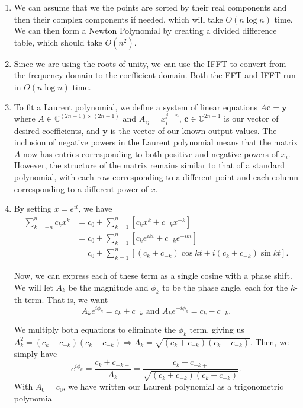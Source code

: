 \documentclass{article}
\begin{document}
\begin{solution}
\begin{enumerate}[label = (\alph*)]
    \item We can assume that we the points are sorted by their real components and then their complex components if needed, which will take $O(n \log n)$ time. We can then form a Newton Polynomial by creating a divided difference table, which should take $O(n^2)$.

    \item Since we are using the roots of unity, we can use the IFFT to convert from the frequency domain to the coefficient domain. Both the FFT and IFFT run in $O(n \log n)$ time.

    \item To fit a Laurent polynomial, we define a system of linear equations $A \boldsymbol{c} = \boldsymbol{y}$ where $A \in \mathbb{C}^{(2n + 1) \times (2n+ 1)}$ and $A_{ij} = x_i^{j-n}$, $\boldsymbol{c} \in \mathbb{C}^{2n + 1}$ is our vector of desired coefficients, and $\boldsymbol{y}$ is the vector of our known output values. The inclusion of negative powers in the Laurent polynomial means that the matrix $A$ now has entries corresponding to both positive and negative powers of $x_i$. However, the structure of the matrix remains similar to that of a standard polynomial, with each row corresponding to a different point and each column corresponding to a different power of $x$.

    \item By setting $x = e^{it}$, we have
	\begin{align*}
		\sum_{k = -n}^n c_kx^k &= c_0 + \sum_{k = 1}^n \left[ c_kx^k + c_{-k}x^{-k}\right]\\
		&= c_0 + \sum_{k = 1}^n \left[ c_ke^{ikt} + c_{-k}e^{-ikt}\right]\\
		&=  c_0 + \sum_{k = 1}^n \left[ (c_k + c_{-k})\cos kt + i (c_k + c_{-k})\sin kt\right].
	\end{align*}

	Now, we can express each of these term as a single cosine with a phase shift. We will let $A_k$ be the magnitude and $\phi_k$ to be the phase angle, each for the $k$-th term. That is, we want $$A_k e^{i \phi_k} = c_k + c_{-k} \text{ and } A_k e^{-i \phi_k} = c_k - c_{-k}.$$

We multiply both equations to eliminate the $\phi_k$ term, giving us $A^2_k = (c_k + c_{-k})(c_k - c_{-k}) \Rightarrow A_k = \sqrt{ (c_k + c_{-k})(c_k - c_{-k})}$. Then, we simply have $$e^{i\phi_k} = \dfrac{c_k + c_{-k+}}{A_k} = \dfrac{c_k + c_{-k+}}{\sqrt{ (c_k + c_{-k})(c_k - c_{-k})}}.$$ With $A_0 = c_0$, we have written our Laurent polynomial as a trigonometric polynomial


\end{enumerate}
\end{solution}
\end{document}

